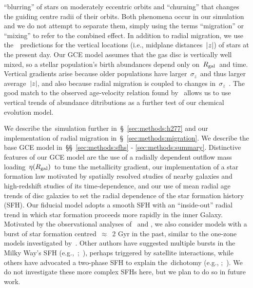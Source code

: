 \documentclass[draft2.tex]{subfiles}
\begin{document}
``blurring'' of stars on moderately eccentric orbits and ``churning'' that 
changes the guiding centre radii of their orbits. 
Both phenomena occur in our simulation and we do not attempt to separate them, 
simply using the terms ``migration'' or ``mixing'' to refer to the combined 
effect. 
In addition to radial migration, we use the~\hsim~predictions for the vertical 
locations (i.e., midplane distances~$\left|z\right|$) of stars at the present day. 
Our GCE model assumes that the gas disc is vertically well mixed, so a stellar 
population's birth abundances depend only on~$R_\text{gal}$~and time. 
Vertical gradients arise because older populations have larger~$\sigma_z$~and 
thus larger average~$\left|z\right|$, and also because radial migration is 
coupled to changes in~$\sigma_z$~\citep*{Solway2012}. 
The good match to the observed age-velocity relation found by~\citet{Bird2020} 
allows us to use vertical trends of abundance ditributions as a further test 
of our chemical evolution model. 
\par 
We describe the~\hsim simulation further in~\S~\ref{sec:methods:h277} and our 
implementation of radial migration in~\S~\ref{sec:methods:migration}. 
We describe the base GCE model in~\S\S~\ref{sec:methods:sfhs} - 
\ref{sec:methods:summary}. Distinctive features of our GCE model are the use 
of a radially dependent outflow mass loading~$\eta(R_\text{gal})$~to tune the 
metallicity gradient, our implementation of a star formation law motivated by 
spatially resolved studies of nearby galaxies and high-redshift studies of its 
time-dependence, and our use of mean radial age trends of disc galaxies to set 
the radial dependence of the star formation history (SFH). 
Our fiducial model adopts a smooth SFH with an ``inside-out'' radial trend in 
which star formation proceeds more rapidly in the inner Galaxy. 
Motivated by the observational analyses of~\citet{Isern2019} and 
\citet{Mor2019}, we also consider models with a burst of star formation 
centred~$\approx$~2 Gyr in the past, similar to the one-zone models 
investigated by~\citet{Johnson2020}. 
Other authors have suggested multiple bursts in the Milky Way's SFH 
(e.g.,~\citealp*{Lian2020a, Lian2020b};~\citealp{RuizLara2020, 
Sysoliatina2021}), perhaps triggered by satellite interactions, while others 
have advocated a two-phase SFH to explain the~\afe dichotomy (e.g., 
\citealp*{Chiappini1997};~\citealp{Haywood2016, Spitoni2019a, Buck2020a, 
Khoperskov2021}). We do not investigate these more complex SFHs here, but we 
plan to do so in future work. 
\end{document}
